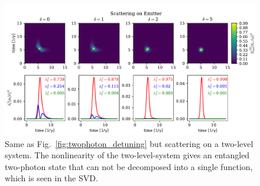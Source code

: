 \begin{figure}
    \centering
    \includegraphics[width = 0.94\linewidth]{figures/twophoton_emitter_detuning.pdf}
    \caption{Same as Fig.~\ref{fig:twophoton_detuning} but scattering on a two-level system. The nonlinearity of the two-level-system gives an entangled two-photon state that can not be decomposed into a single function, which is seen in the SVD. }
    \label{fig:twophoton_emitter_detuning}
\end{figure}